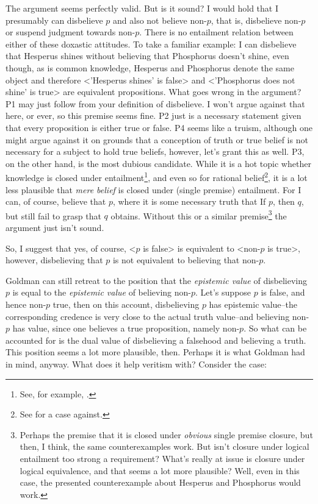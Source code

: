 \documentclass[12pt,numbers=noenddot]{scrartcl}
\begin{document}
The argument seems perfectly valid. But is it sound? I would hold that I presumably can disbelieve $p$ and also not believe non-$p$, that is, disbelieve non-$p$ or suspend judgment towards non-$p$. There is no entailment relation between either of these doxastic attitudes. To take a familiar example: I can disbelieve that Hesperus shines without believing that Phosphorus doesn't shine, even though, as is common knowledge, Hesperus and Phosphorus denote the same object and therefore <'Hesperus shines' is false> and <'Phosphorus does not shine' is true> are equivalent propositions. What goes wrong in the argument? P1 may just follow from your definition of disbelieve. I won't argue against that here, or ever, so this premise seems fine. P2 just is a necessary statement given that every proposition is either true or false. P4 seems like a truism, although one might argue against it on grounds that a conception of truth or true belief is not necessary for a subject to hold true beliefs, however, let's grant this as well. P3, on the other hand, is the most dubious candidate. While it is a hot topic whether knowledge is closed under entailment\footnote{See, for example, \textcite{Dretske2005-DREIKC}.}, and even so for rational belief\footnote{See \textcite{KyburgJr1970-KYBC-2} for a case against.}, it is a lot less plausible that \emph{mere belief} is closed under (single premise) entailment. For I can, of course, believe that $p$, where it is some necessary truth that If $p$, then $q$, but still fail to grasp that $q$ obtains. Without this or a similar premise\footnote{Perhaps the premise that it is closed under \emph{obvious} single premise closure, but then, I think, the same counterexamples work. But isn't closure under logical entailment too strong a requirement? What's really at issue is closure under logical equivalence, and that seems a lot more plausible? Well, even in this case, the presented counterexample about Hesperus and Phosphorus would work.} the argument just isn't sound.

So, I suggest that yes, of course, <$p$ is false> is equivalent to <non-$p$ is true>, however, disbelieving that $p$ is not equivalent to believing that non-$p$.

Goldman can still retreat to the position that the \emph{epistemic value} of disbelieving $p$ is equal to the \emph{epistemic value} of believing non-$p$. Let's suppose $p$ is false, and hence non-$p$ true, then on this account, disbelieving $p$ has epistemic value–the corresponding credence is very close to the actual truth value–and believing non-$p$ has value, since one believes a true proposition, namely non-$p$. So what can be accounted for is the dual value of disbelieving a falsehood and believing a truth. This position seems a lot more plausible, then. Perhaps it is what Goldman had in mind, anyway. What does it help veritism with? Consider the case:
\end{document}
